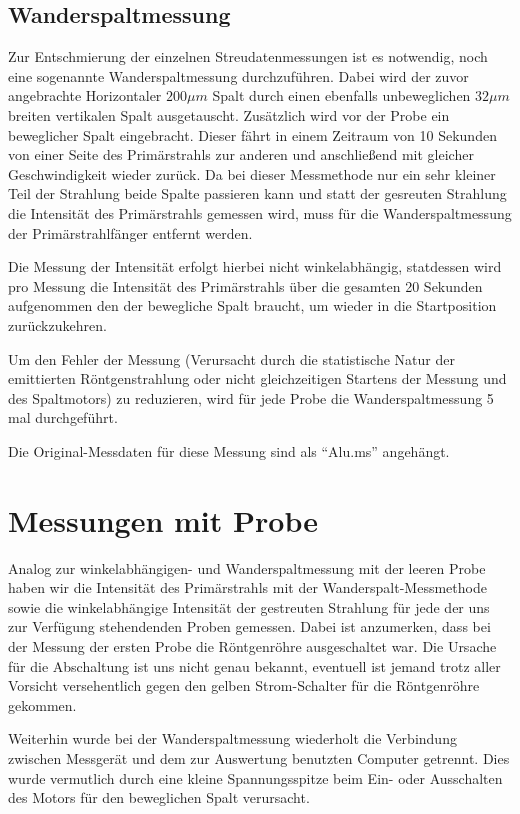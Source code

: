 \documentclass[bigchapter,colorback,accentcolor=tud4b,linedtoc,11pt]{tudreport}
\begin{document}
\subsection{Wanderspaltmessung}
Zur Entschmierung der einzelnen Streudatenmessungen ist es notwendig, noch eine sogenannte Wanderspaltmessung durchzuführen. Dabei wird der zuvor angebrachte Horizontaler $200\mu m$ Spalt durch einen ebenfalls unbeweglichen $32 \mu m$ breiten vertikalen Spalt ausgetauscht. Zusätzlich wird vor der Probe ein beweglicher Spalt eingebracht. Dieser fährt in einem Zeitraum von 10 Sekunden von einer Seite des Primärstrahls zur anderen und anschließend mit gleicher Geschwindigkeit wieder zurück. Da bei dieser Messmethode nur ein sehr kleiner Teil der Strahlung beide Spalte passieren kann und statt der gesreuten Strahlung die Intensität des Primärstrahls gemessen wird, muss für die Wanderspaltmessung der Primärstrahlfänger entfernt werden.

Die Messung der Intensität erfolgt hierbei nicht winkelabhängig, statdessen wird pro Messung die Intensität des Primärstrahls über die gesamten 20 Sekunden aufgenommen den der bewegliche Spalt braucht, um wieder in die Startposition zurückzukehren.

Um den Fehler der Messung (Verursacht durch die statistische Natur der emittierten Röntgenstrahlung oder nicht gleichzeitigen Startens der Messung und des Spaltmotors) zu reduzieren, wird für jede Probe die Wanderspaltmessung 5 mal durchgeführt.

Die Original-Messdaten für diese Messung sind als "`Alu.ms"' angehängt.

\section{Messungen mit Probe}
Analog zur winkelabhängigen- und Wanderspaltmessung mit der leeren Probe haben wir die Intensität des Primärstrahls mit der Wanderspalt-Messmethode sowie die winkelabhängige Intensität der gestreuten Strahlung für jede der uns zur Verfügung stehendenden Proben gemessen. Dabei ist anzumerken, dass bei der Messung der ersten Probe die Röntgenröhre ausgeschaltet war. Die Ursache für die Abschaltung ist uns nicht genau bekannt, eventuell ist jemand trotz aller Vorsicht versehentlich gegen den gelben Strom-Schalter für die Röntgenröhre gekommen.

Weiterhin wurde bei der Wanderspaltmessung wiederholt die Verbindung zwischen Messgerät und dem zur Auswertung benutzten Computer getrennt. Dies wurde vermutlich durch eine kleine Spannungsspitze beim Ein- oder Ausschalten des Motors für den beweglichen Spalt verursacht.
\end{document}
